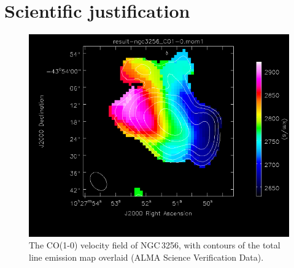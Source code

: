 \documentclass{alma_proposal}
\begin{document}
 



\section{Scientific justification}

 


\begin{figure}[tbh]
\includegraphics[scale=0.2]{CO_velfield.png}
\caption{The CO(1-0) velocity field of NGC\,3256, with contours 
of the total line emission map overlaid (ALMA Science Verification Data).}
\end{figure}
\end{document}
